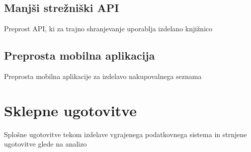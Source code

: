 \documentclass[a4paper,12pt,openright]{book}
\begin{document}
    \section{Manjši strežniški API}
    \colorbox{BurntOrange}{Preprost API, ki za trajno shranjevanje uporablja izdelano knjižnico}
    
    \section{Preprosta mobilna aplikacija}
    \colorbox{BurntOrange}{Preprosta mobilna aplikacije za izdelavo nakupovalnega seznama}

\chapter{Sklepne ugotovitve}
    \colorbox{BurntOrange}{Splošne ugotovitve tekom izdelave vgrajenega podatkovnega sistema}
    \newline
    \colorbox{BurntOrange}{in strnjene ugotovitve glede na analizo}


\raggedright

\printbibliography[heading=bibintoc,title={Literatura}]
\end{document}
